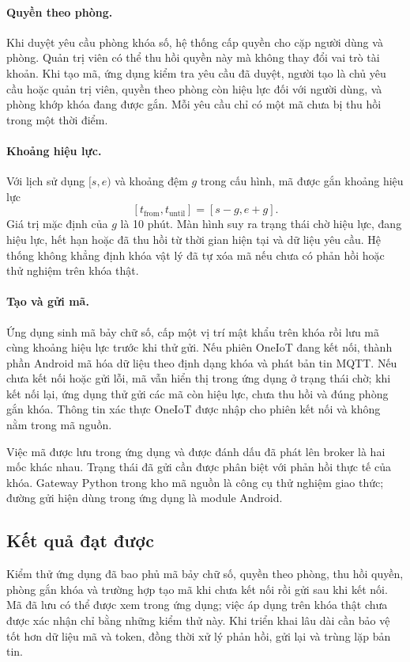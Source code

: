 \documentclass[../DoAn.tex]{subfiles}
\begin{document}
\paragraph{Quyền theo phòng.} Khi duyệt yêu cầu phòng khóa số, hệ thống cấp quyền cho cặp người dùng và phòng. Quản trị viên có thể thu hồi quyền này mà không thay đổi vai trò tài khoản. Khi tạo mã, ứng dụng kiểm tra yêu cầu đã duyệt, người tạo là chủ yêu cầu hoặc quản trị viên, quyền theo phòng còn hiệu lực đối với người dùng, và phòng khớp khóa đang được gắn. Mỗi yêu cầu chỉ có một mã chưa bị thu hồi trong một thời điểm.

\paragraph{Khoảng hiệu lực.} Với lịch sử dụng $[s,e)$ và khoảng đệm $g$ trong cấu hình, mã được gắn khoảng hiệu lực
\begin{equation}\label{eq:pin}
[t_{\mathrm{from}},t_{\mathrm{until}}]=[s-g,e+g].
\end{equation}
Giá trị mặc định của $g$ là 10 phút. Màn hình suy ra trạng thái chờ hiệu lực, đang hiệu lực, hết hạn hoặc đã thu hồi từ thời gian hiện tại và dữ liệu yêu cầu. Hệ thống không khẳng định khóa vật lý đã tự xóa mã nếu chưa có phản hồi hoặc thử nghiệm trên khóa thật.

\paragraph{Tạo và gửi mã.} Ứng dụng sinh mã bảy chữ số, cấp một vị trí mật khẩu trên khóa rồi lưu mã cùng khoảng hiệu lực trước khi thử gửi. Nếu phiên OneIoT đang kết nối, thành phần Android mã hóa dữ liệu theo định dạng khóa và phát bản tin MQTT. Nếu chưa kết nối hoặc gửi lỗi, mã vẫn hiển thị trong ứng dụng ở trạng thái chờ; khi kết nối lại, ứng dụng thử gửi các mã còn hiệu lực, chưa thu hồi và đúng phòng gắn khóa. Thông tin xác thực OneIoT được nhập cho phiên kết nối và không nằm trong mã nguồn.

Việc mã được lưu trong ứng dụng và được đánh dấu đã phát lên broker là hai mốc khác nhau. Trạng thái đã gửi cần được phân biệt với phản hồi thực tế của khóa. Gateway Python trong kho mã nguồn là công cụ thử nghiệm giao thức; đường gửi hiện dùng trong ứng dụng là module Android.

\subsection{Kết quả đạt được}
Kiểm thử ứng dụng đã bao phủ mã bảy chữ số, quyền theo phòng, thu hồi quyền, phòng gắn khóa và trường hợp tạo mã khi chưa kết nối rồi gửi sau khi kết nối. Mã đã lưu có thể được xem trong ứng dụng; việc áp dụng trên khóa thật chưa được xác nhận chỉ bằng những kiểm thử này. Khi triển khai lâu dài cần bảo vệ tốt hơn dữ liệu mã và token, đồng thời xử lý phản hồi, gửi lại và trùng lặp bản tin.
\end{document}
